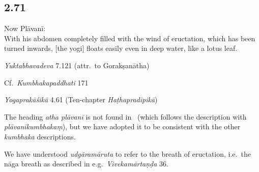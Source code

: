\begin{ekdosis}
\subsection*{2.71}
\begin{translation}[hp02_071]
Now Plāvanī:\\
With his abdomen completely filled with the wind of eructation, which has been turned inwards, [the yogi] floats easily even in deep water, like a lotus leaf.
\end{translation}

\begin{testimonia}[hp02_071]

\emph{Yuktabhavadeva} 7.121 (attr.~to Gorakṣanātha)

\begin{versinnote}
\end{versinnote}

Cf.~\emph{Kumbhakapaddhati} 171

\begin{versinnote}
\end{versinnote}

\emph{Yogaprakāśikā} 4.61 (Ten-chapter \emph{Haṭhapradīpikā})

\begin{versinnote}
\end{versinnote}
\end{testimonia}

\begin{philcomm}[hp02_071]
The heading \emph{atha plāvanī} is not found in \alphaOne \ (which follows the description with \emph{plāvanīkumbhakaṃ}), but we have adopted it to be consistent with the other \emph{kumbhaka} descriptions.

We have understood \emph{udgāramāruta} to refer to the breath of eructation, i.e.~the nāga breath as described in e.g.~\emph{Vivekamārtaṇḍa} 36.


\end{philcomm}
\end{ekdosis}
